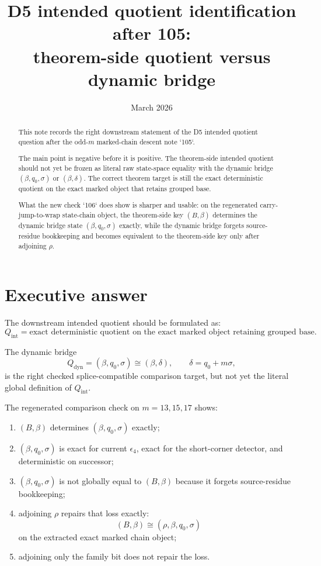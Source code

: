 \documentclass[11pt]{article}
\title{D5 intended quotient identification after 105:\\
theorem-side quotient versus dynamic bridge}
\author{}
\date{March 2026}
\begin{document}
\maketitle

\begin{abstract}
This note records the right downstream statement of the D5 intended quotient
question after the odd-$m$ marked-chain descent note `105`.

The main point is negative before it is positive. The theorem-side intended
quotient should not yet be frozen as literal raw state-space equality with the
dynamic bridge $(\beta,q_0,\sigma)$ or $(\beta,\delta)$. The correct theorem
target is still the exact deterministic quotient on the exact marked object
that retains grouped base.

What the new check `106` does show is sharper and usable: on the regenerated
carry-jump-to-wrap state-chain object, the theorem-side key $(B,\beta)$
determines the dynamic bridge state $(\beta,q_0,\sigma)$ exactly, while the
dynamic bridge forgets source-residue bookkeeping and becomes equivalent to the
theorem-side key only after adjoining $\rho$.
\end{abstract}

\section{Executive answer}

The downstream intended quotient should be formulated as:
\[
Q_{\mathrm{int}}
=
\text{exact deterministic quotient on the exact marked object retaining grouped base.}
\]

The dynamic bridge
\[
Q_{\mathrm{dyn}}=(\beta,q_0,\sigma)\cong(\beta,\delta),\qquad \delta=q_0+m\sigma,
\]
is the right checked splice-compatible comparison target, but not yet the
literal global definition of $Q_{\mathrm{int}}$.

The regenerated comparison check on $m=13,15,17$ shows:
\begin{enumerate}[label=\textup{(\arabic*)},leftmargin=2.8em]
\item $(B,\beta)$ determines $(\beta,q_0,\sigma)$ exactly;
\item $(\beta,q_0,\sigma)$ is exact for current $\epsilon_4$, exact for the
      short-corner detector, and deterministic on successor;
\item $(\beta,q_0,\sigma)$ is not globally equal to $(B,\beta)$ because it
      forgets source-residue bookkeeping;
\item adjoining $\rho$ repairs that loss exactly:
      \[
      (B,\beta)\cong (\rho,\beta,q_0,\sigma)
      \]
      on the extracted exact marked chain object;
\item adjoining only the family bit does not repair the loss.
\end{enumerate}
\end{document}
